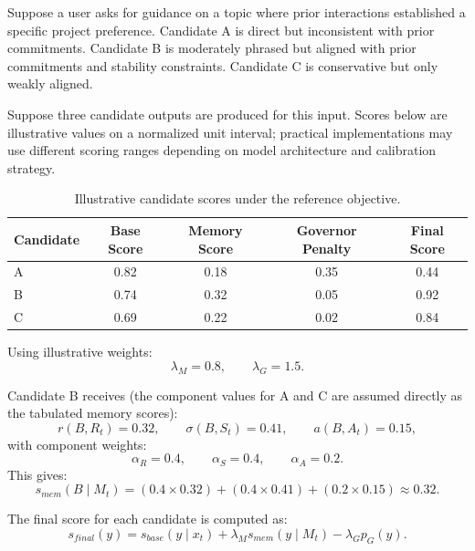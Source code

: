 \documentclass[11pt]{article}
\begin{document}
Suppose a user asks for guidance on a topic where prior interactions established a specific project preference. Candidate A is direct but inconsistent with prior commitments. Candidate B is moderately phrased but aligned with prior commitments and stability constraints. Candidate C is conservative but only weakly aligned.

Suppose three candidate outputs are produced for this input. Scores below are illustrative values on a normalized unit interval; practical implementations may use different scoring ranges depending on model architecture and calibration strategy.

\begin{table}[ht]
\centering
\begin{tabular}{lcccc}
\toprule
Candidate & Base Score & Memory Score & Governor Penalty & Final Score \\
\midrule
A & 0.82 & 0.18 & 0.35 & 0.44 \\
B & 0.74 & 0.32 & 0.05 & 0.92 \\
C & 0.69 & 0.22 & 0.02 & 0.84 \\
\bottomrule
\end{tabular}
\caption{Illustrative candidate scores under the reference objective.}
\label{tab:scenario}
\end{table}

Using illustrative weights:
\begin{equation}
\lambda_M = 0.8, \qquad \lambda_G = 1.5.
\end{equation}

Candidate B receives (the component values for A and C are assumed directly as the tabulated memory scores):
\begin{equation}
r(B,R_t)=0.32, \qquad \sigma(B,S_t)=0.41, \qquad a(B,A_t)=0.15,
\end{equation}
with component weights:
\begin{equation}
\alpha_R = 0.4, \qquad \alpha_S = 0.4, \qquad \alpha_A = 0.2.
\end{equation}
This gives:
\begin{equation}
s_{mem}(B \mid M_t)
=
(0.4 \times 0.32)
+
(0.4 \times 0.41)
+
(0.2 \times 0.15)
\approx 0.32.
\end{equation}

The final score for each candidate is computed as:
\begin{equation}
s_{final}(y)
=
s_{base}(y \mid x_t)
+
\lambda_M s_{mem}(y \mid M_t)
-
\lambda_G p_G(y).
\end{equation}
\end{document}
